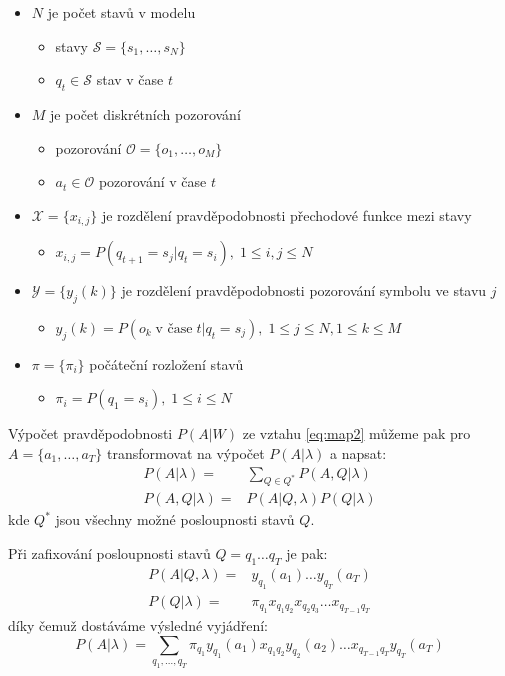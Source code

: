 \begin{itemize}
\item $N$ je počet stavů v modelu
	\begin{itemize}
	\item stavy $\mathcal{S} = \{s_1,\dots,s_N\}$
	\item $q_t \in \mathcal{S}$ stav v čase $t$
	\end{itemize}
\item $M$ je počet diskrétních pozorování
	\begin{itemize}
	\item pozorování $\mathcal{O} = \{o_1,\dots,o_M\}$
	\item $a_t \in \mathcal{O}$ pozorování v čase $t$
	\end{itemize}
\item $\mathcal{X} = \{x_{i,j}\}$ je rozdělení pravděpodobnosti přechodové funkce mezi stavy
	\begin{itemize}
	\item $x_{i,j} = P(q_{t+1} = s_j | q_t = s_i),\; 1 \le i, j \le N$
	\end{itemize}
\item $\mathcal{Y} = \{y_j(k)\}$ je rozdělení pravděpodobnosti pozorování symbolu ve stavu $j$
	\begin{itemize}
	\item $y_j(k) = P(o_k\;\text{v čase}\;t|q_t = s_j),\; 1 \le j \le N, 1 \le k \le M$
	\end{itemize}
\item $\pi = \{\pi_i\}$ počáteční rozložení stavů
	\begin{itemize}
	\item $\pi_i = P(q_1 = s_i),\; 1 \le i \le N$
	\end{itemize}
\end{itemize}

Výpočet pravděpodobnosti $P(A|W)$ ze vztahu \ref{eq:map2} můžeme pak pro $A = \{a_1,\dots,a_T\}$ transformovat na výpočet $P(A|\lambda)$ a napsat:
%
\begin{align}
	P(A|\lambda)   =& \sum\limits_{Q\in Q^*} P(A,Q|\lambda)\\
	P(A,Q|\lambda) =& P(A|Q,\lambda) P(Q|\lambda)
\end{align}
%
kde $Q^*$ jsou všechny možné posloupnosti stavů $Q$.

Při zafixování posloupnosti stavů $Q = q_1\dots q_T$ je pak:
%
\begin{align}
	P(A|Q,\lambda) =& y_{q_1}(a_1)\dots y_{q_T}(a_T)\\
	P(Q|\lambda)   =& \pi_{q_1}x_{q_1q_2}x_{q_2q_3}\dots x_{q_{T-1}q_T}
\end{align}
%
díky čemuž dostáváme výsledné vyjádření:
%
\begin{equation}
	P(A|\lambda) = \sum\limits_{q_1,\dots,q_T} \pi_{q_1}y_{q_1}(a_1)x_{q_1q_2}y_{q_2}(a_2)\dots x_{q_{T-1}q_T}y_{q_T}(a_T)
	\label{eq:am}
\end{equation}

